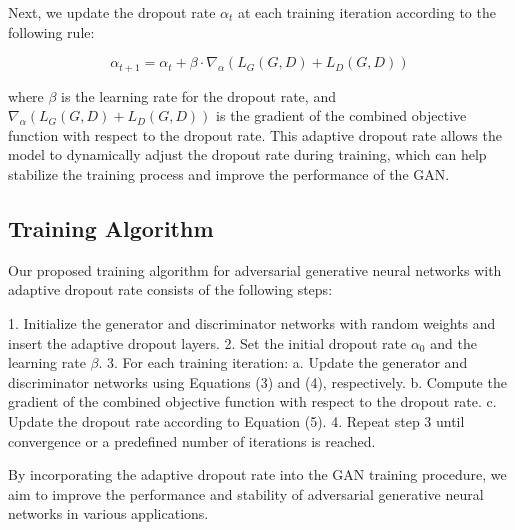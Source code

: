 Next, we update the dropout rate $\alpha_t$ at each training iteration according to the following rule:

\begin{equation}
\alpha_{t+1} = \alpha_t + \beta \cdot \nabla_\alpha (L_G(G, D) + L_D(G, D))
\end{equation}

where $\beta$ is the learning rate for the dropout rate, and $\nabla_\alpha (L_G(G, D) + L_D(G, D))$ is the gradient of the combined objective function with respect to the dropout rate. This adaptive dropout rate allows the model to dynamically adjust the dropout rate during training, which can help stabilize the training process and improve the performance of the GAN.

\subsection{Training Algorithm}
Our proposed training algorithm for adversarial generative neural networks with adaptive dropout rate consists of the following steps:

1. Initialize the generator and discriminator networks with random weights and insert the adaptive dropout layers.
2. Set the initial dropout rate $\alpha_0$ and the learning rate $\beta$.
3. For each training iteration:
   a. Update the generator and discriminator networks using Equations (3) and (4), respectively.
   b. Compute the gradient of the combined objective function with respect to the dropout rate.
   c. Update the dropout rate according to Equation (5).
4. Repeat step 3 until convergence or a predefined number of iterations is reached.

By incorporating the adaptive dropout rate into the GAN training procedure, we aim to improve the performance and stability of adversarial generative neural networks in various applications.